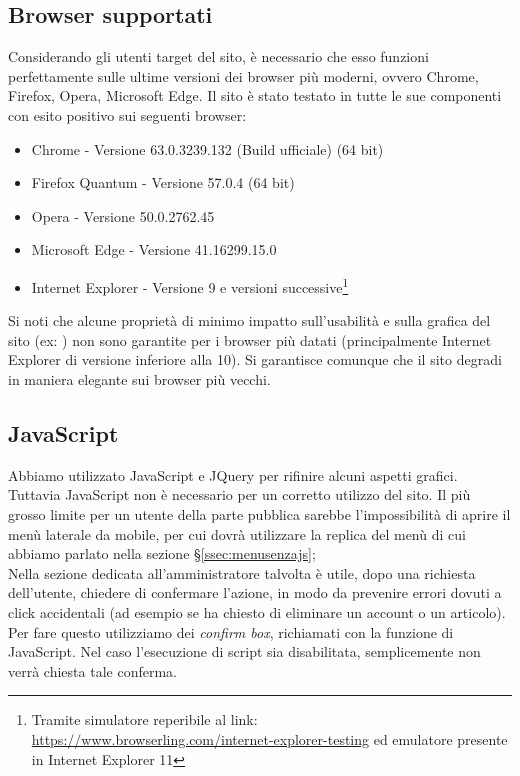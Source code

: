 \documentclass[12pt]{article}
\begin{document}
	\subsection{Browser supportati}
	
	Considerando gli utenti target del sito, è necessario che esso funzioni perfettamente sulle ultime versioni dei browser più moderni, ovvero Chrome, Firefox, Opera, Microsoft Edge. Il sito è stato testato in tutte le sue componenti con esito positivo sui seguenti browser:
	
	\begin{itemize}
		\item Chrome - Versione 63.0.3239.132 (Build ufficiale) (64 bit)
		\item Firefox Quantum - Versione 57.0.4 (64 bit)
		\item Opera - Versione 50.0.2762.45 
		\item Microsoft Edge - Versione 41.16299.15.0
		\item Internet Explorer - Versione 9 e versioni successive\footnote{Tramite simulatore reperibile al link:\\ \url{https://www.browserling.com/internet-explorer-testing} ed emulatore presente in Internet Explorer 11}
	\end{itemize} 

	\noindent Si noti che alcune proprietà di minimo impatto sull'usabilità e sulla grafica del sito (ex: ) non sono garantite per i browser più datati (principalmente Internet Explorer di versione inferiore alla 10). Si garantisce comunque che il sito degradi in maniera elegante sui browser più vecchi.

	\subsection{JavaScript}
	Abbiamo utilizzato JavaScript e JQuery per rifinire alcuni aspetti grafici. Tuttavia JavaScript non è necessario per un corretto utilizzo del sito. Il più grosso limite per un utente della parte pubblica sarebbe l'impossibilità di aprire il menù laterale da mobile, per cui dovrà utilizzare la replica del menù di cui abbiamo parlato nella sezione §\ref{ssec:menusenzajs};\\
	Nella sezione dedicata all'amministratore talvolta è utile, dopo una richiesta dell'utente, chiedere di confermare l'azione, in modo da prevenire errori dovuti a click accidentali (ad esempio se ha chiesto di eliminare un account o un articolo). Per fare questo utilizziamo dei \textit{confirm box}, richiamati con la funzione  di JavaScript. Nel caso l'esecuzione di script sia disabilitata, semplicemente non verrà chiesta tale conferma.
\end{document}
